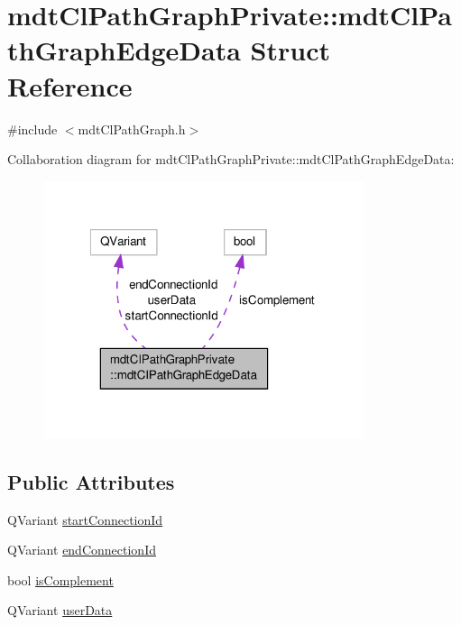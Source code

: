 \hypertarget{structmdt_cl_path_graph_private_1_1mdt_cl_path_graph_edge_data}{\section{mdt\-Cl\-Path\-Graph\-Private\-:\-:mdt\-Cl\-Path\-Graph\-Edge\-Data Struct Reference}
\label{structmdt_cl_path_graph_private_1_1mdt_cl_path_graph_edge_data}
}


{\ttfamily \#include $<$mdt\-Cl\-Path\-Graph.\-h$>$}



Collaboration diagram for mdt\-Cl\-Path\-Graph\-Private\-:\-:mdt\-Cl\-Path\-Graph\-Edge\-Data\-:\nopagebreak
\begin{figure}[H]
\begin{center}
\leavevmode
\includegraphics[width=267pt]{structmdt_cl_path_graph_private_1_1mdt_cl_path_graph_edge_data__coll__graph}
\end{center}
\end{figure}
\subsection*{Public Attributes}
\begin{DoxyCompactItemize}
\item 
Q\-Variant \hyperlink{structmdt_cl_path_graph_private_1_1mdt_cl_path_graph_edge_data_a4d17d73e0bbc09b541b91a9ca1cad8da}{start\-Connection\-Id}
\item 
Q\-Variant \hyperlink{structmdt_cl_path_graph_private_1_1mdt_cl_path_graph_edge_data_a6dfdd2c68bdec4556ab367517737b7a1}{end\-Connection\-Id}
\item 
bool \hyperlink{structmdt_cl_path_graph_private_1_1mdt_cl_path_graph_edge_data_a423302ffa14fedbb80f362f9f44960d7}{is\-Complement}
\item 
Q\-Variant \hyperlink{structmdt_cl_path_graph_private_1_1mdt_cl_path_graph_edge_data_a64c472d1739bbf6deed62f2e96d01f55}{user\-Data}
\end{DoxyCompactItemize}


